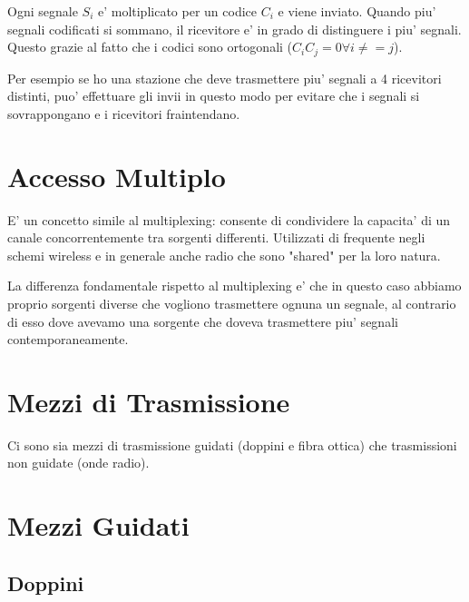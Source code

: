 Ogni segnale $S_i$ e' moltiplicato per un codice $C_i$ e viene inviato. Quando piu' segnali codificati si sommano, il ricevitore e' in grado di distinguere i piu' segnali. Questo grazie al fatto che i codici sono ortogonali ($C_iC_j = 0 \forall i \neq= j$).


Per esempio se ho una stazione che deve trasmettere piu' segnali a 4 ricevitori distinti, puo' effettuare gli invii in questo modo per evitare che i segnali si sovrappongano e i ricevitori fraintendano.




\section{Accesso Multiplo}

E' un concetto simile al multiplexing: consente di condividere la capacita' di un canale concorrentemente tra sorgenti differenti.
Utilizzati di frequente negli schemi wireless e in generale anche radio che sono "shared" per la loro natura.

La differenza fondamentale rispetto al multiplexing e' che in questo caso abbiamo proprio sorgenti diverse che vogliono trasmettere ognuna un segnale, al contrario di esso dove avevamo una sorgente che doveva trasmettere piu' segnali contemporaneamente.


\section{Mezzi di Trasmissione}

Ci sono sia mezzi di trasmissione guidati (doppini e fibra ottica) che trasmissioni non guidate (onde radio).

\section{Mezzi Guidati}

\subsection{Doppini}


